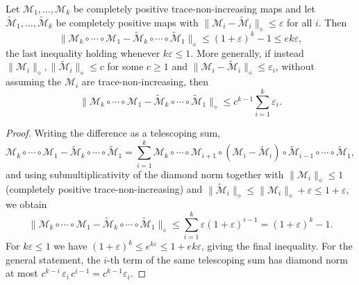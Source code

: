 \begin{lemma*}[\ref{lemma:composition}]
Let $\mathcal{M}_1, \ldots, \mathcal{M}_k$ be completely positive trace-non-increasing maps and let $\tilde{\mathcal{M}}_1, \ldots, \tilde{\mathcal{M}}_k$ be completely positive maps with $\|\mathcal{M}_i - \tilde{\mathcal{M}}_i\|_{\diamond} \leq \varepsilon$ for all $i$. Then
\begin{equation}
    \|\mathcal{M}_k \circ \cdots \circ \mathcal{M}_1 - \tilde{\mathcal{M}}_k \circ \cdots \circ \tilde{\mathcal{M}}_1\|_{\diamond} \leq (1+\varepsilon)^k - 1 \leq e k \varepsilon,
\end{equation}
the last inequality holding whenever $k\varepsilon \leq 1$. More generally, if instead $\|\mathcal{M}_i\|_{\diamond}, \|\tilde{\mathcal{M}}_i\|_{\diamond} \leq c$ for some $c \geq 1$ and $\|\mathcal{M}_i - \tilde{\mathcal{M}}_i\|_{\diamond} \leq \varepsilon_i$, without assuming the $\mathcal{M}_i$ are trace-non-increasing, then
\begin{equation}
    \|\mathcal{M}_k \circ \cdots \circ \mathcal{M}_1 - \tilde{\mathcal{M}}_k \circ \cdots \circ \tilde{\mathcal{M}}_1\|_{\diamond} \leq c^{k-1}\sum_{i=1}^{k}\varepsilon_i .
\end{equation}
\end{lemma*}
\begin{proof}
    Writing the difference as a telescoping sum,
\begin{equation}
    \mathcal{M}_k \circ \cdots \circ \mathcal{M}_1 - \tilde{\mathcal{M}}_k \circ \cdots \circ \tilde{\mathcal{M}}_1 = \sum_{i=1}^{k} \mathcal{M}_k \circ \cdots \circ \mathcal{M}_{i+1} \circ (\mathcal{M}_i - \tilde{\mathcal{M}}_i) \circ \tilde{\mathcal{M}}_{i-1} \circ \cdots \circ \tilde{\mathcal{M}}_1,
\end{equation}
and using submultiplicativity of the diamond norm together with $\|\mathcal{M}_i\|_{\diamond} \leq 1$ (completely positive trace-non-increasing) and $\|\tilde{\mathcal{M}}_i\|_{\diamond} \leq \|\mathcal{M}_i\|_{\diamond} + \varepsilon \leq 1 + \varepsilon$, we obtain
\begin{equation}
    \|\mathcal{M}_k \circ \cdots \circ \mathcal{M}_1 - \tilde{\mathcal{M}}_k \circ \cdots \circ \tilde{\mathcal{M}}_1\|_{\diamond} \leq \sum_{i=1}^{k}\varepsilon(1+\varepsilon)^{i-1} = (1+\varepsilon)^k - 1.
\end{equation}
For $k\varepsilon \leq 1$ we have $(1+\varepsilon)^k \leq e^{k\varepsilon} \leq 1 + e k\varepsilon$, giving the final inequality. For the general statement, the $i$-th term of the same telescoping sum has diamond norm at most $c^{k-i}\,\varepsilon_i\,c^{i-1} = c^{k-1}\varepsilon_i$.
\end{proof}
